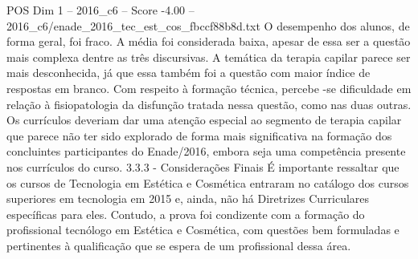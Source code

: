 \begin{textsample}{POS Dim 1 – 2016\_c6 – Score -4.00 – 2016\_c6/enade\_2016\_tec\_est\_cos\_fbccf88b8d.txt}
O desempenho dos alunos, de forma geral, foi fraco.
A média foi considerada baixa, apesar de essa ser a questão mais complexa dentre as três discursivas.
A temática da terapia capilar parece ser mais desconhecida, já que essa também foi a questão com maior índice de respostas em branco.
Com respeito à formação técnica, percebe -se dificuldade em relação à fisiopatologia da disfunção tratada nessa questão, como nas duas outras.
Os currículos deveriam dar uma atenção especial ao segmento de terapia capilar que parece não ter sido explorado de forma mais significativa na formação dos concluintes participantes do Enade/2016, embora seja uma competência presente nos currículos do curso. 3.3.3 - Considerações Finais É importante ressaltar que os cursos de Tecnologia em Estética e Cosmética entraram no catálogo dos cursos superiores em tecnologia em 2015 e, ainda, não há Diretrizes Curriculares específicas para eles.
Contudo, a prova foi condizente com a formação do profissional tecnólogo em Estética e Cosmética, com questões bem formuladas e pertinentes à qualificação que se espera de um profissional dessa área.

\end{textsample}

